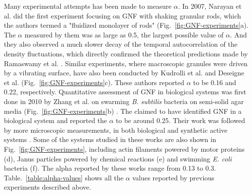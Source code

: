 Many experimental attempts has been made to measure $\alpha$. In 2007, Narayan et al. did the first experiment focusing on GNF with shaking granular rods, which the authors termed a "fluidized monolayer of rods" (Fig.~\ref{fig:GNF-experiments}a)\cite{Narayan2007}. The $\alpha$ measured by them was as large as 0.5, the largest possible value of $\alpha$. And they also observed a much slower decay of the temporal autocorrelation of the density fluctuations, which directly confirmed the theoretical predictions made by Ramaswamy et al. \cite{Ramaswamy2003}.
Similar experiments, where macroscopic granules were driven by a vibrating surface, have also been conducted by Kudrolli et al. \cite{Kudrolli2008} and Deseigne et al. (Fig.~\ref{fig:GNF-experiments}c)\cite{Deseigne2010}. These authors reported $\alpha$ to be 0.16 and 0.22, respectively.
Quantitative assessment of GNF in biological systems was first done in 2010 by Zhang et al. on swarming \textit{B. subtilis} bacteria on semi-solid agar media (Fig.~\ref{fig:GNF-experiments}b) \cite{Zhang2010}.
The claimed to have identified GNF in a biological system and reported the $\alpha$ to be around 0.25.
Their work was followed by more microscopic measurements, in both biological and synthetic active systems \cite{Schaller2013, Palacci2013, Kawaguchi2017, Nishiguchi2017, Karani2019}.
Some of the systems studied in these works are also shown in Fig.~\ref{fig:GNF-experiments}, including actin filaments powered by motor proteins (d), Janus particles powered by chemical reactions (e) and swimming \textit{E. coli} bacteria (f).
The alpha reported by these works range from 0.13 to 0.3.
Table.~\ref{table:alpha-values} shows all the $\alpha$ values reported by previous experiments described above.


